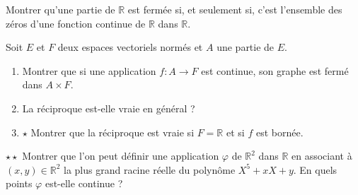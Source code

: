 \documentclass[french,a4paper]{article}
\newcommand{\R}{\mathbb{R}}
\theoremstyle{plain}
\theoremstyle{definition}
\theoremstyle{remark}
\begin{document}
\begin{ex}{}
	Montrer qu'une partie de $\R$ est fermée si, et seulement si, c'est l'ensemble des zéros d'une fonction continue de $\R$ dans $\R$.
\end{ex}

\begin{ex}{}
	Soit $E$ et $F$ deux espaces vectoriels normés et $A$ une partie de $E$.
	\begin{enumerate}
		\item Montrer que si une application $f:A\to F$ est continue, son graphe est fermé dans $A\times F$.
		\item La réciproque est-elle vraie en général ?
		\item $\star$ Montrer que la réciproque est vraie si $F=\R$ et si $f$ est bornée.
	\end{enumerate}
\end{ex}

\begin{ex}{$\star\star$}
	Montrer que l'on peut définir une application $\varphi$ de $\R^2$ dans $\R$ en associant à $(x,y)\in\R^2$ la plus grand racine réelle du polynôme $X^5+xX+y$. En quels points $\varphi$ est-elle continue ?
\end{ex}
\end{document}
